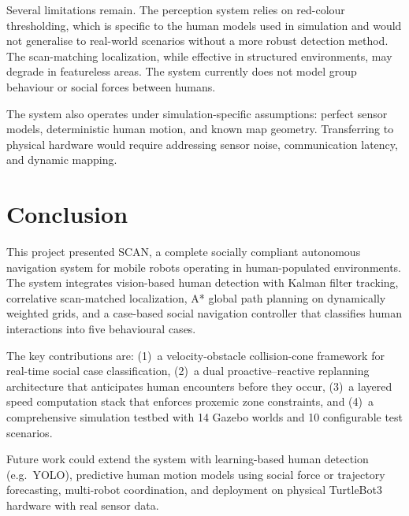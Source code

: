\documentclass[a4paper]{article}
\begin{document}
Several limitations remain. The perception system relies on red-colour thresholding, which is specific to the human models used in simulation and would not generalise to real-world scenarios without a more robust detection method. The scan-matching localization, while effective in structured environments, may degrade in featureless areas. The system currently does not model group behaviour or social forces between humans.

The system also operates under simulation-specific assumptions: perfect sensor models, deterministic human motion, and known map geometry. Transferring to physical hardware would require addressing sensor noise, communication latency, and dynamic mapping.


\section{Conclusion}

This project presented SCAN, a complete socially compliant autonomous navigation system for mobile robots operating in human-populated environments. The system integrates vision-based human detection with Kalman filter tracking, correlative scan-matched localization, A* global path planning on dynamically weighted grids, and a case-based social navigation controller that classifies human interactions into five behavioural cases.

The key contributions are: (1)~a velocity-obstacle collision-cone framework for real-time social case classification, (2)~a dual proactive--reactive replanning architecture that anticipates human encounters before they occur, (3)~a layered speed computation stack that enforces proxemic zone constraints, and (4)~a comprehensive simulation testbed with 14 Gazebo worlds and 10 configurable test scenarios.

Future work could extend the system with learning-based human detection (e.g.\ YOLO), predictive human motion models using social force or trajectory forecasting, multi-robot coordination, and deployment on physical TurtleBot3 hardware with real sensor data.
\end{document}
